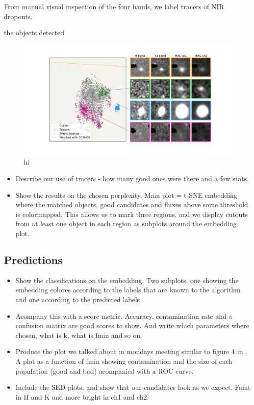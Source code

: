 From manual visual inspection of the four bands, we label tracers of NIR dropouts.

the objects detected

\begin{figure}[]
    \centering %
    \includegraphics[trim={0cm 0cm 0cm 0cm},clip,width=\textwidth]{Code/Saved_Figures/Visual_inspection_embedding.pdf}
    \caption{hi}
    \label{embedding_regions}
\end{figure}

\begin{itemize}
    \item Describe our use of tracers - how many good ones were there and a few stats.
    \item Show the results on the chosen perplexity. Main plot = t-SNE embedding where the matched objects, good candidates and fluxes above some threshold is colormapped. This allows us to mark three regions, and we display cutouts from at least one object in each region as subplots around the embedding plot.
\end{itemize}

\subsection{Predictions}
\begin{itemize}
    \item Show the classifications on the embedding. Two subplots, one showing the embedding colores according to the labels that are known to the algorithm and one according to the predicted labels.
    \item Acompany this with a score metric. Accuracy, contamination rate and a confusion matrix are good scores to show. And write which parameters where chosen, what is k, what is fmin and so on.
    \item Produce the plot we talked about in mondays meeting similar to figure 4 in \cite{Steinhardt_2020}. A plot as a function of fmin showing contamination and the size of each population (good and bad) acompanied with a ROC curve.
    \item Include the SED plots, and show that our candidates look as we expect. Faint in H and K and more bright in ch1 and ch2.
\end{itemize}

